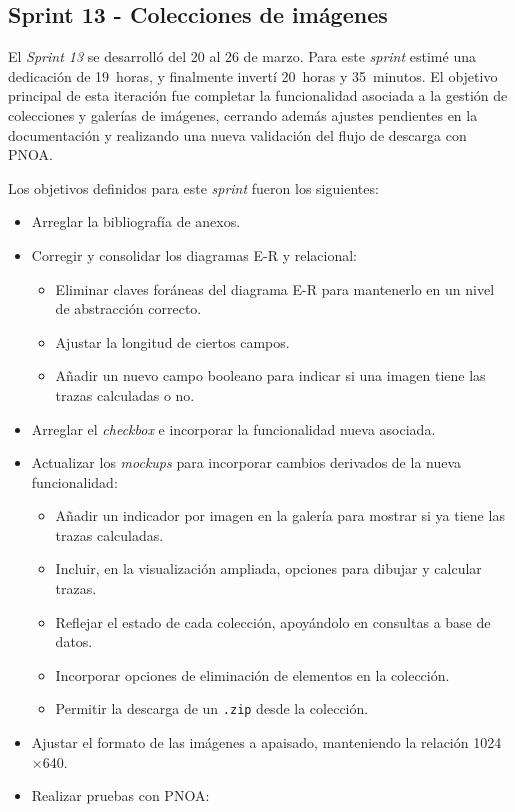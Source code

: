 \subsection{Sprint 13 - Colecciones de imágenes}
El \textit{Sprint 13} se desarrolló del 20 al 26 de marzo. Para este \textit{sprint} estimé una dedicación de 19~horas, y finalmente invertí 20~horas y 35~minutos. El objetivo principal de esta iteración fue completar la funcionalidad asociada a la gestión de colecciones y galerías de imágenes, cerrando además ajustes pendientes en la documentación y realizando una nueva validación del flujo de descarga con PNOA.

Los objetivos definidos para este \textit{sprint} fueron los siguientes:
\begin{itemize}
	\item Arreglar la bibliografía de anexos.
	\item Corregir y consolidar los diagramas E-R y relacional:
	\begin{itemize}
		\item Eliminar claves foráneas del diagrama E-R para mantenerlo en un nivel de abstracción correcto.
		\item Ajustar la longitud de ciertos campos.
		\item Añadir un nuevo campo booleano para indicar si una imagen tiene las trazas calculadas o no.
	\end{itemize}
	\item Arreglar el \textit{checkbox} e incorporar la funcionalidad nueva asociada.
	\item Actualizar los \textit{mockups} para incorporar cambios derivados de la nueva funcionalidad:
	\begin{itemize}
		\item Añadir un indicador por imagen en la galería para mostrar si ya tiene las trazas calculadas.
		\item Incluir, en la visualización ampliada, opciones para dibujar y calcular trazas.
		\item Reflejar el estado de cada colección, apoyándolo en consultas a base de datos.
		\item Incorporar opciones de eliminación de elementos en la colección.
		\item Permitir la descarga de un \texttt{.zip} desde la colección.
	\end{itemize}
	\item Ajustar el formato de las imágenes a apaisado, manteniendo la relación 1024$\times$640.
	\item Realizar pruebas con PNOA:

\end{itemize}
